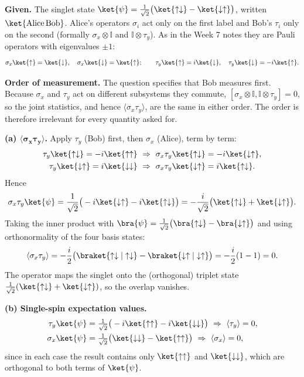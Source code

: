 \begin{solutionbox}
\textbf{Given.} The singlet state $\ket{\psi}=\frac{1}{\sqrt2}\big(\ket{\uparrow\downarrow}-\ket{\downarrow\uparrow}\big)$, written $\ket{\text{Alice}\,\text{Bob}}$. Alice's operators $\sigma_i$ act only on the first label and Bob's $\tau_i$ only on the second (formally $\sigma_x\otimes\mathbb{I}$ and $\mathbb{I}\otimes\tau_y$). As in the Week 7 notes they are Pauli operators with eigenvalues $\pm1$:
\[
\sigma_x\ket{\uparrow}=\ket{\downarrow},\quad\sigma_x\ket{\downarrow}=\ket{\uparrow};\qquad
\tau_y\ket{\uparrow}=i\ket{\downarrow},\quad\tau_y\ket{\downarrow}=-i\ket{\uparrow}.
\]

\textbf{Order of measurement.} The question specifies that Bob measures first. Because $\sigma_x$ and $\tau_y$ act on different subsystems they commute, $[\sigma_x\otimes\mathbb{I},\mathbb{I}\otimes\tau_y]=0$, so the joint statistics, and hence $\langle\sigma_x\tau_y\rangle$, are the same in either order. The order is therefore irrelevant for every quantity asked for.

\textbf{(a) $\boldsymbol{\langle\sigma_x\tau_y\rangle}$.} Apply $\tau_y$ (Bob) first, then $\sigma_x$ (Alice), term by term:
\begin{align*}
\tau_y\ket{\uparrow\downarrow}=-i\ket{\uparrow\uparrow}&\ \Rightarrow\ \sigma_x\tau_y\ket{\uparrow\downarrow}=-i\ket{\downarrow\uparrow},\\
\tau_y\ket{\downarrow\uparrow}=i\ket{\downarrow\downarrow}&\ \Rightarrow\ \sigma_x\tau_y\ket{\downarrow\uparrow}=i\ket{\uparrow\downarrow}.
\end{align*}
Hence
\[
\sigma_x\tau_y\ket{\psi}=\frac{1}{\sqrt2}\big(-i\ket{\downarrow\uparrow}-i\ket{\uparrow\downarrow}\big)=-\frac{i}{\sqrt2}\big(\ket{\uparrow\downarrow}+\ket{\downarrow\uparrow}\big).
\]
Taking the inner product with $\bra{\psi}=\frac{1}{\sqrt2}\big(\bra{\uparrow\downarrow}-\bra{\downarrow\uparrow}\big)$ and using orthonormality of the four basis states:
\[
\langle\sigma_x\tau_y\rangle=-\frac{i}{2}\big(\braket{\uparrow\downarrow|\uparrow\downarrow}-\braket{\downarrow\uparrow|\downarrow\uparrow}\big)=-\frac{i}{2}(1-1)=0 .
\]
The operator maps the singlet onto the (orthogonal) triplet state $\frac{1}{\sqrt2}(\ket{\uparrow\downarrow}+\ket{\downarrow\uparrow})$, so the overlap vanishes.

\textbf{(b) Single-spin expectation values.}
\begin{align*}
\tau_y\ket{\psi}&=\tfrac{1}{\sqrt2}\big(-i\ket{\uparrow\uparrow}-i\ket{\downarrow\downarrow}\big)\ \Rightarrow\ \langle\tau_y\rangle=0,\\
\sigma_x\ket{\psi}&=\tfrac{1}{\sqrt2}\big(\ket{\downarrow\downarrow}-\ket{\uparrow\uparrow}\big)\ \Rightarrow\ \langle\sigma_x\rangle=0,
\end{align*}
since in each case the result contains only $\ket{\uparrow\uparrow}$ and $\ket{\downarrow\downarrow}$, which are orthogonal to both terms of $\ket{\psi}$.


\end{solutionbox}
